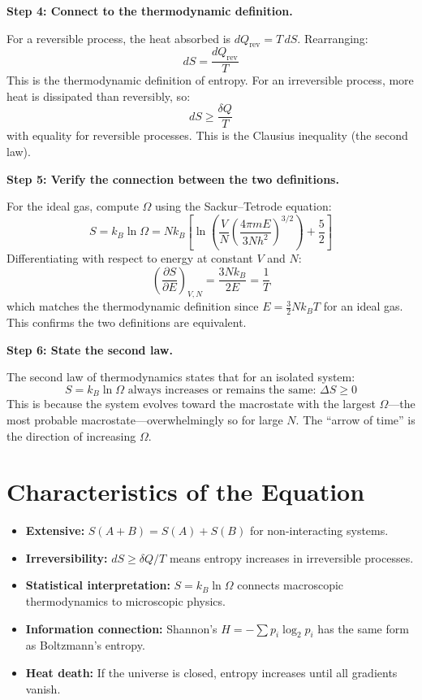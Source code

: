 \documentclass[11pt,openright]{book}
\begin{document}
\textbf{Step 4: Connect to the thermodynamic definition.}

For a reversible process, the heat absorbed is $dQ_{\text{rev}} = T\,dS$. Rearranging:
\begin{equation}
dS = \frac{dQ_{\text{rev}}}{T}
\end{equation}
This is the thermodynamic definition of entropy. For an irreversible process, more heat is dissipated than reversibly, so:
\begin{equation}
dS \geq \frac{\delta Q}{T}
\end{equation}
with equality for reversible processes. This is the Clausius inequality (the second law).

\textbf{Step 5: Verify the connection between the two definitions.}

For the ideal gas, compute $\Omega$ using the Sackur--Tetrode equation:
\begin{equation}
S = k_B\ln\Omega = Nk_B\left[\ln\left(\frac{V}{N}\left(\frac{4\pi m E}{3Nh^2}\right)^{3/2}\right) + \frac{5}{2}\right]
\end{equation}
Differentiating with respect to energy at constant $V$ and $N$:
\begin{equation}
\left(\frac{\partial S}{\partial E}\right)_{V,N} = \frac{3Nk_B}{2E} = \frac{1}{T}
\end{equation}
which matches the thermodynamic definition since $E = \frac{3}{2}Nk_BT$ for an ideal gas. This confirms the two definitions are equivalent.

\textbf{Step 6: State the second law.}

The second law of thermodynamics states that for an isolated system:
\begin{equation}
\boxed{S = k_B\ln\Omega \text{ always increases or remains the same: } \Delta S \geq 0}
\end{equation}
This is because the system evolves toward the macrostate with the largest $\Omega$---the most probable macrostate---overwhelmingly so for large $N$. The ``arrow of time'' is the direction of increasing $\Omega$.

\section*{Characteristics of the Equation}

\begin{itemize}
\item \textbf{Extensive:} $S(A + B) = S(A) + S(B)$ for non-interacting systems.
\item \textbf{Irreversibility:} $dS \geq \delta Q/T$ means entropy increases in irreversible processes.
\item \textbf{Statistical interpretation:} $S = k_B \ln \Omega$ connects macroscopic thermodynamics to microscopic physics.
\item \textbf{Information connection:} Shannon's $H = -\sum p_i \log_2 p_i$ has the same form as Boltzmann's entropy.
\item \textbf{Heat death:} If the universe is closed, entropy increases until all gradients vanish.
\end{itemize}
\end{document}

